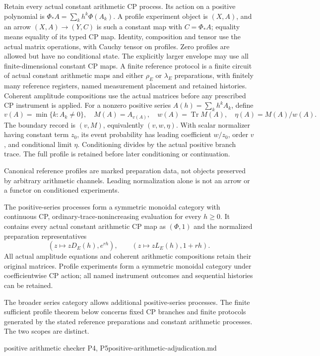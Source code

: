 \begin{definition}
Retain every actual constant arithmetic CP process. Its action on a
positive polynomial is $\Phi_*A=\sum_kh^k\Phi(A_k)$.
A profile experiment object is $(X,A)$, and an arrow
$(X,A)\to(Y,C)$ is such a constant map with $C=\Phi_*A$; equality means
equality of its typed CP map. Identity, composition and tensor use the
actual matrix operations, with Cauchy tensor on profiles. Zero profiles
are allowed but have no conditional state. The explicitly larger envelope
may use all finite-dimensional constant CP maps.
A finite reference protocol is a finite circuit of actual constant
arithmetic maps and either $\rho_E$ or $\lambda_E$ preparations, with
finitely many reference registers, named measurement placement and retained
histories. Coherent amplitude compositions use the actual matrices before
any prescribed CP instrument is applied.
For a nonzero positive series $A(h)=\sum_kh^kA_k$, define
\[
 v(A)=\min\{k:A_k\ne0\},\quad M(A)=A_{v(A)},\quad
 w(A)=\operatorname{Tr}M(A),\quad \eta(A)=M(A)/w(A).
\]
The boundary record is $(v,M)$, equivalently $(v,w,\eta)$. With scalar
normalizer having constant term $z_0$, its event probability has leading
coefficient $w/z_0$, order $v$, and conditional limit $\eta$.
Conditioning divides by the actual positive branch trace. The full profile
is retained before later conditioning or continuation.
\end{definition}
\begin{scope}
Canonical reference profiles are marked preparation data, not objects
preserved by arbitrary arithmetic channels. Leading normalization alone
is not an arrow or a functor on conditioned experiments.
\end{scope}

\begin{proposition}
\statusProved\quad
The positive-series processes form a symmetric monoidal category with
continuous CP, ordinary-trace-nonincreasing evaluation for every $h\geq0$.
It contains every actual constant arithmetic CP map as $(\Phi,1)$ and the
normalized preparation representatives
\[
 (z\mapsto zD_E(h),e^{rh}),\qquad (z\mapsto zL_E(h),1+rh).
\]
All actual amplitude equations and coherent arithmetic compositions retain
their original matrices. Profile experiments form a symmetric monoidal
category under coefficientwise CP action; all named instrument outcomes
and sequential histories can be retained.
\end{proposition}
\begin{scope}
The broader series category allows additional positive-series processes.
The finite sufficient profile theorem below concerns fixed CP branches
and finite protocols generated by the stated reference preparations and
constant arithmetic processes. The two scopes are distinct.
\end{scope}
{positive arithmetic checker P4, P5}{positive-arithmetic-adjudication.md}

